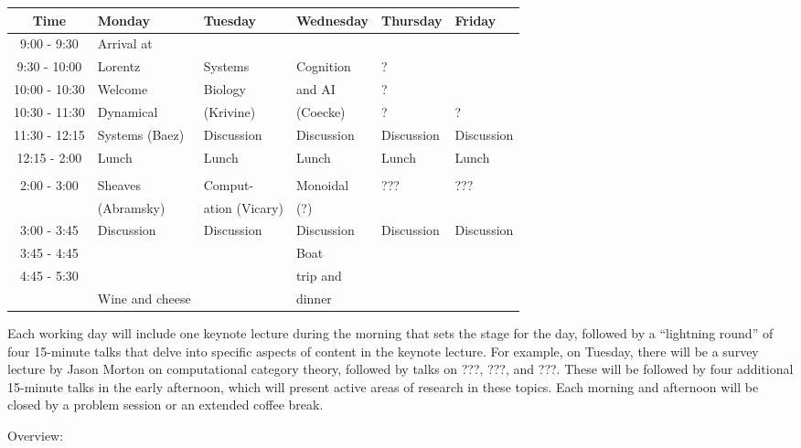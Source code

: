 \documentclass{article}
\newcommand{\redout}[1]{{\color{red}#1}}
\begin{document}
\begin{table}[h!]
\begin{center}
\begin{tabular}{|c||p{.15\linewidth}|p{.15\linewidth}|p{.15\linewidth}|p{.15\linewidth}|p{.15\linewidth}|}
\hline
Time & Monday & Tuesday & Wednesday & Thursday & Friday \\ \hline
9:00 - 9:30 & Arrival at & & & & \\ \cline{3-6}
9:30 - 10:00 & Lorentz & Systems & Cognition & ? & \\ \cline{2-2}
10:00 - 10:30 & Welcome & Biology & and AI & ? & \\ \cline{2-2}
10:30 - 11:30 & Dynamical & (Krivine) & (Coecke) & ? & ? \\  \cline{3-6}
11:30 - 12:15 & Systems (Baez) & Discussion & Discussion & Discussion & Discussion \\ \hline
12:15 - 2:00 & Lunch & Lunch & Lunch & Lunch & Lunch \\
&&&&& \\ \hline
2:00 - 3:00 & Sheaves & Comput- & Monoidal & ??? & ??? \\
& (Abramsky) & ation (Vicary) & (?) & & \\ \hline
3:00 - 3:45 & Discussion & Discussion & Discussion & Discussion & Discussion \\ \hline
3:45 - 4:45 & & & Boat & & \\ 
4:45 - 5:30 & & & trip and & & \\ \cline{2-3} \cline{5-6}
& Wine and cheese & & dinner & &  \\ \hline
\end{tabular}
\end{center}
\end{table}%

Each working day will include one keynote lecture during the morning that sets the stage for the day, followed by a ``lightning round'' of four 15-minute talks that delve into specific aspects of content in the keynote lecture. For example, on Tuesday, there will be a survey lecture by \redout{Jason Morton} on computational category theory, followed by talks on \redout{???}, \redout{???}, and \redout{???}. These will be followed by four additional 15-minute talks in the early afternoon, which will present active areas of research in these topics. Each morning and afternoon will be closed by a problem session or an extended coffee break. 

Overview: 
\end{document}
